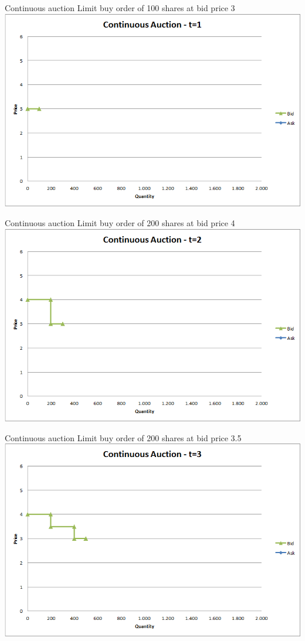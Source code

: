 \documentclass[english,10pt
,aspectratio=169
]{beamer}
\begin{document}
\begin{frame}{Continuous auction}
	Limit buy order of 100 shares at bid price 3
	\quad
	\center
	\includegraphics[width=.75\linewidth]{pics/Continuous_t1}
\end{frame}


\begin{frame}{Continuous auction}
	Limit buy order of 200 shares at bid price 4
	\quad
	\center
	\includegraphics[width=.75\linewidth]{pics/Continuous_t2}
\end{frame}


\begin{frame}{Continuous auction}
	Limit buy order of 200 shares at bid price 3.5
	\quad
	\center
	\includegraphics[width=.75\linewidth]{pics/Continuous_t3}
\end{frame}
\end{document}
